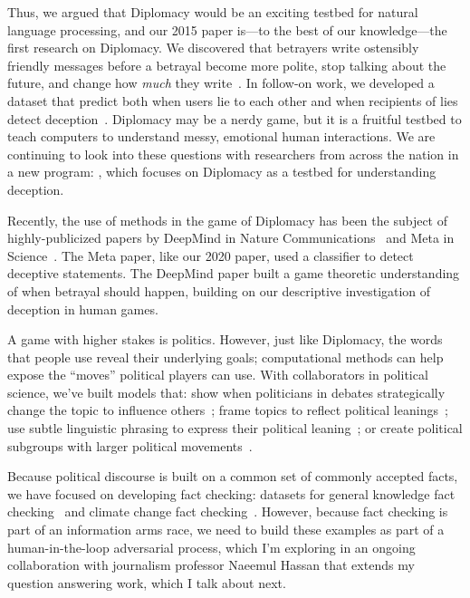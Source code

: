 Thus, we argued that Diplomacy would be an exciting testbed for
natural language processing, and our 2015 paper is---to the best of
our knowledge---the first  research on Diplomacy.
%
We discovered that betrayers write ostensibly friendly messages before
a betrayal become more polite, stop talking about the future, and
change how \emph{much} they write~\cite{niculae-15}.
%
In follow-on work, we developed a dataset that predict both when users
lie to each other and when recipients of lies detect
deception~\cite{Peskov-20}.
%
Diplomacy may be a nerdy game, but it is a fruitful testbed to teach
computers to understand messy, emotional human interactions.
%
We are continuing to look into these questions with researchers from
across the nation in a new  program: , which
focuses on Diplomacy as a testbed for understanding deception.

Recently, the use of  methods in the game of Diplomacy has
been the subject of highly-publicized papers by DeepMind in Nature
Communications~\cite{kramar-22} and Meta in Science~\cite{bakhtin-22}.
%
The Meta paper, like our 2020 paper, used a classifier to detect
deceptive statements.
%
The DeepMind paper built a game theoretic understanding of when
betrayal should happen, building on our descriptive investigation of
deception in human games.

A game with higher stakes is politics. However, just like Diplomacy,
the words that people use reveal their underlying goals; computational
methods can help expose the ``moves'' political players can use. With
collaborators in political science, we've built models that: show when
politicians in debates strategically change the topic to influence
others~\cite{nguyen-12,Nguyen-14b}; frame topics to reflect political
leanings~\cite{nguyen-13:shlda}; use subtle linguistic phrasing to
express their political leaning~\cite{iyyer-14a}; or create political
subgroups with larger political
movements~\cite{Nguyen:Boyd-Graber:Resnik:Miler-2015}.

Because political discourse is built on a common set of commonly
accepted facts, we have focused on developing fact checking: datasets
for general knowledge fact checking~\cite{eisenschlos-21} and climate
change fact checking~\cite{Diggelmann-20}.
%
However, because fact checking is part of an information arms race, we
need to build these examples as part of a human-in-the-loop
adversarial process, which I'm exploring in an ongoing collaboration
with journalism professor Naeemul Hassan that extends my question
answering work, which I talk about next.

